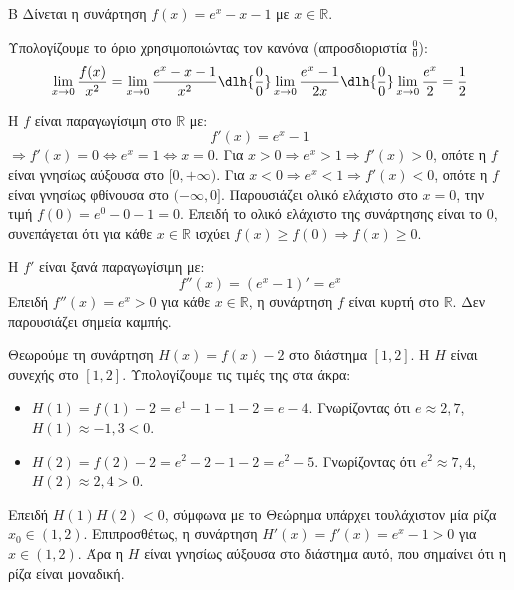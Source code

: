\begin{thema}{Β}
Δίνεται η συνάρτηση $f(x) = e^x - x - 1$ με $x \in \mathbb{R}$.
\begin{erwthma}
\item Υπολογίζουμε το όριο χρησιμοποιώντας τον κανόνα  (απροσδιοριστία $\frac{0}{0}$):
\[ \lim_{x\to0} \frac{f(x)}{x^2} = \lim_{x\to0} \frac{e^x - x - 1}{x^2} \dlh{\frac{0}{0}} \lim_{x\to0} \frac{e^x - 1}{2x} \dlh{\frac{0}{0}} \lim_{x\to0} \frac{e^x}{2} = \frac{1}{2} \]

\item Η $f$ είναι παραγωγίσιμη στο $\mathbb{R}$ με:
\[ f'(x) = e^x - 1 \]
$\Rightarrow f'(x) = 0 \Leftrightarrow e^x = 1 \Leftrightarrow x = 0$.
Για $x > 0 \Rightarrow e^x > 1 \Rightarrow f'(x) > 0$, οπότε η $f$ είναι γνησίως αύξουσα στο $[0, +\infty)$.
Για $x < 0 \Rightarrow e^x < 1 \Rightarrow f'(x) < 0$, οπότε η $f$ είναι γνησίως φθίνουσα στο $(-\infty, 0]$.
Παρουσιάζει ολικό ελάχιστο στο $x=0$, την τιμή $f(0) = e^0 - 0 - 1 = 0$.
Επειδή το ολικό ελάχιστο της συνάρτησης είναι το 0, συνεπάγεται ότι για κάθε $x \in \mathbb{R}$ ισχύει $f(x) \ge f(0) \Rightarrow f(x) \ge 0$.

\item Η $f'$ είναι ξανά παραγωγίσιμη με:
\[ f''(x) = (e^x - 1)' = e^x \]
Επειδή $f''(x) = e^x > 0$ για κάθε $x \in \mathbb{R}$, η συνάρτηση $f$ είναι κυρτή στο $\mathbb{R}$. Δεν παρουσιάζει σημεία καμπής.

\item Θεωρούμε τη συνάρτηση $H(x) = f(x) - 2$ στο διάστημα $[1, 2]$.
Η $H$ είναι συνεχής στο $[1, 2]$.
Υπολογίζουμε τις τιμές της στα άκρα:
\begin{itemize}
\item $H(1) = f(1) - 2 = e^1 - 1 - 1 - 2 = e - 4$. Γνωρίζοντας ότι $e \approx 2{,}7$, $H(1) \approx -1{,}3 < 0$.
\item $H(2) = f(2) - 2 = e^2 - 2 - 1 - 2 = e^2 - 5$. Γνωρίζοντας ότι $e^2 \approx 7{,}4$, $H(2) \approx 2{,}4 > 0$.
\end{itemize}
Επειδή $H(1)H(2) < 0$, σύμφωνα με το Θεώρημα  υπάρχει τουλάχιστον μία ρίζα $x_0 \in (1, 2)$.
Επιπροσθέτως, η συνάρτηση $H'(x) = f'(x) = e^x - 1 > 0$ για $x \in (1, 2)$. Άρα η $H$ είναι γνησίως αύξουσα στο διάστημα αυτό, που σημαίνει ότι η ρίζα είναι μοναδική.
\end{erwthma}
\end{thema}
